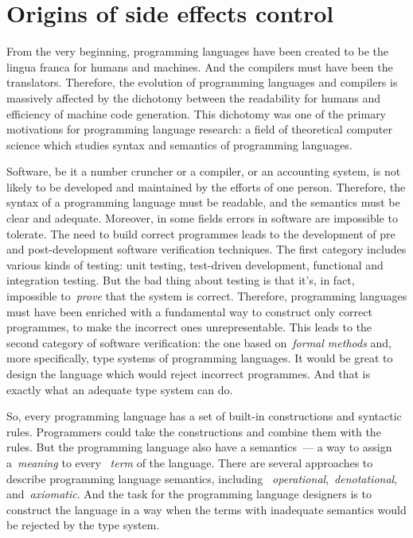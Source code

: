 \section{Origins of side effects control}

From the very beginning, programming languages have been created to be the lingua franca
for humans and machines. And the compilers must have been the translators.
Therefore, the evolution of programming languages and compilers is
massively affected by the dichotomy between the readability for humans and efficiency
of machine code generation. This dichotomy was one of the primary motivations for
programming language research: a field of theoretical computer science which
studies syntax and semantics of programming languages.

Software, be it a number cruncher or a compiler, or
an accounting system, is not likely to be developed and maintained by the efforts
of one person. Therefore, the syntax of a programming language must be readable,
and the semantics must be clear and adequate. Moreover, in some fields errors in
software are impossible to tolerate. The need to build correct programmes leads to the
development of pre and post-development software verification techniques. The first
category includes various kinds of testing: unit testing, test-driven development,
functional and integration testing. But the bad thing about testing is that it's,
in fact, impossible to~\emph{prove} that the system is correct.
Therefore, programming languages must have been enriched with a fundamental way
to construct only correct programmes, to make the incorrect ones unrepresentable.
This leads to the second category of software verification: the one based
on~\emph{formal methods} and, more specifically, type systems of programming
languages. It would be great to design the language which would reject incorrect
programmes. And that is exactly what an adequate type system can do.

So, every programming language has a set of built-in constructions and syntactic rules.
Programmers could take the constructions and combine them with the rules. But the programming
language also have a semantics~--- a way to assign a~\emph{meaning} to every ~\emph{term}
of the language. There are several approaches to describe programming language
semantics, including ~\emph{operational},~\emph{denotational}, and~\emph{axiomatic}.
And the task for the programming language designers is to construct
the language in a way when the terms with inadequate semantics would be rejected
by the type system.

